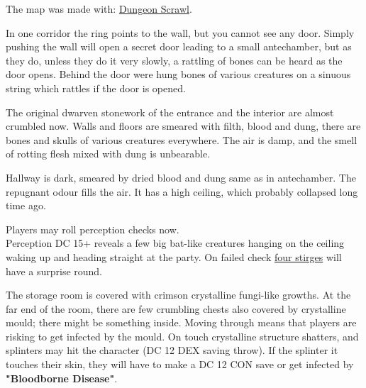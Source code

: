 \documentclass[10pt,onecolumn,twoside,openany,bg=full,layout=true]{dndbook}
\begin{document}
The map was made with: \href{https://probabletrain.itch.io/dungeon-scrawl}{Dungeon Scrawl}.

In one corridor the ring points to the wall, but you cannot see any door.
Simply pushing the wall will open a secret door leading to a small antechamber, but as they do,
unless they do it very slowly, a rattling of bones can be heard as the door opens.
Behind the door were hung bones of various creatures on a sinuous string which rattles if the door is opened.
\vfill
\newpage

The original dwarven stonework of the entrance and the interior are almost crumbled now.
Walls and floors are smeared with filth, blood and dung, there are bones and skulls of various creatures everywhere.
The air is damp, and the smell of rotting flesh mixed with dung is unbearable.

Hallway is dark, smeared by dried blood and dung same as in antechamber.
The repugnant odour fills the air.
It has a high ceiling, which probably collapsed long time ago.

Players may roll perception checks now. \\
Perception DC 15+ reveals a few big bat-like creatures hanging on the ceiling waking up and heading straight at the party.
On failed check \href{https://www.dndbeyond.com/monsters/17023-stirge}{four stirges} will have a surprise round.

The storage room is covered with crimson crystalline fungi-like growths.
At the far end of the room, there are few crumbling chests also covered by crystalline mould; there might be something inside.
Moving through means that players are risking to get infected by the mould.
On touch crystalline structure shatters, and splinters may hit the character (DC 12 DEX saving throw).
If the splinter it touches their skin, they will have to make a DC 12 CON save or get infected by \textbf{"Bloodborne Disease"}.

\vfill
\newpage
\end{document}
